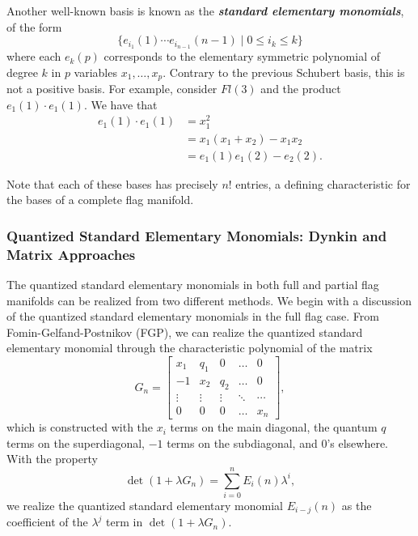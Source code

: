 \documentclass[11pt]{article}
\begin{document}
Another well-known basis is known as the \textbf{\textit{standard elementary monomials}}, of the form
\[
    \{e_{i_1}(1) \cdots e_{i_{n-1}}(n-1) \mid 0 \leq i_k \leq k \}
\]
where each $e_k(p)$ corresponds to the elementary symmetric polynomial of degree $k$ in $p$ variables $x_1, \dots, x_p$. Contrary to the previous Schubert basis, this is not a positive basis. For example, consider $Fl(3)$ and the product $e_1(1) \cdot e_1(1).$ We have that
\begin{align*}
    e_1(1) \cdot e_1(1) &= x_1^2 \\
    &= x_1(x_1 + x_2) - x_1x_2 \\
    &= e_1(1)e_1(2) - e_2(2).
\end{align*}

Note that each of these bases has precisely $n!$ entries, a defining characteristic for the bases of a complete flag manifold. \\

\subsubsection{Quantized Standard Elementary Monomials: Dynkin and Matrix Approaches}
The quantized standard elementary monomials in both full and partial flag manifolds can be realized from two different methods. We begin with a discussion of the quantized standard elementary monomials in the full flag case. From Fomin-Gelfand-Postnikov (FGP), we can realize the quantized standard elementary monomial through the characteristic polynomial of the matrix
\[
    G_n = \begin{bmatrix}
    x_1 & q_1 & 0 & \dots & 0 \\
    -1 & x_2 & q_2 & \dots & 0 \\
    \vdots & \vdots & \vdots & \ddots & \cdots \\
    0 & 0 & 0 & \dots & x_n
    \end{bmatrix},
\]
which is constructed with the $x_i$ terms on the main diagonal, the quantum $q$ terms on the superdiagonal, $-1$ terms on the subdiagonal, and $0$'s elsewhere. \\

With the property
\[
    \det(1 + \lambda G_n) = \sum\limits_{i=0}^n E_i(n) \lambda^i,
\]
we realize the quantized standard elementary monomial $E_{i-j}(n)$ as the coefficient of the $\lambda^j$ term in $\det(1 + \lambda G_n)$. \\
\end{document}
